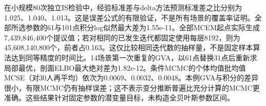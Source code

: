 在小规模80次独立IS检验中，经验标准差与delta方法预测标准差之比分别为1.025、1.040、1.013。这是误差公式的有限验证，不是所有场景的覆盖率证明。全部所选参数的61与101点积分log似然最大差为1.55e-11。全部MCEM起点实际生成7,439,846,400个提议值；若对相同的已发生迭代都固定使用每层8192，则为45,608,140,800个，前者占0.163。这仅比较相同迭代数的抽样量，不是固定样本算法达到同等精度的时间比。14场景第一次重复的GVA，以61点替换31点后重新求局部最优，剖面ELBO最大绝对差为1.82e-12。条件MCMC的个体均值批均值MCSE（对30人再平均）依次为0.0069、0.0032、0.0048。本例GVA与积分的差异很小，有限MCMC仍有抽样误差；这不表示变分推断普遍比充分计算的MCMC更准确。这些结果针对固定参数的潜变量目标，未构造全贝叶斯参数区间。